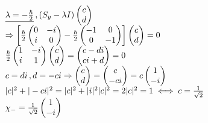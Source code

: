 \documentclass[14pt]{extarticle}
\makeatletter
\newenvironment{lefteqs}{%
    \begin{english}%
    \begin{flushleft}%
    \renewcommand{\arraystretch}{1.3}%
    $\begin{array}{@{}l@{}}%
}{%
    \end{array}$%
    \end{flushleft}%
    \end{english}%
}
\makeatother
\begin{document}
\begin{lefteqs}
    \underline{\lambda = -\frac{\hbar}{2}} \, , (S_y - \lambda I) \begin{pmatrix}
        c \\
        d
    \end{pmatrix} \\
    \Rightarrow \left[ \frac{\hbar}{2} \begin{pmatrix}
        0 & -i \\
        i & 0
    \end{pmatrix} - \frac{\hbar}{2} \begin{pmatrix}
        -1 & 0 \\
        0 & -1
    \end{pmatrix} \right] \begin{pmatrix}
        c \\
        d
    \end{pmatrix} = 0 \\
    \frac{\hbar}{2} \begin{pmatrix}
        1 & -i \\
        i & 1
    \end{pmatrix} \begin{pmatrix}
        c \\
        d
    \end{pmatrix} = \begin{pmatrix}
        c - di \\
        ci + d
    \end{pmatrix} = 0 \\
    c = di \, , d = -ci \Rightarrow \begin{pmatrix}
        c \\
        d
    \end{pmatrix} = \begin{pmatrix}
        c \\
        -ci
    \end{pmatrix} = c \begin{pmatrix}
        1 \\
        -i
    \end{pmatrix} \\
    |c|^2 + |-ci|^2 = |c|^2 + |i|^2|c|^2 = 2|c|^2=1 \iff c=\frac{1}{\sqrt{2}} \\
    \chi_- = \frac{1}{\sqrt{2}} \begin{pmatrix}
        1 \\
        -i
    \end{pmatrix}
\end{lefteqs}
\end{document}
